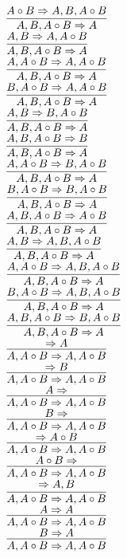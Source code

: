 \documentclass[11pt]{article}
\begin{document}
\begin{center}
\bigskip
\\$\infer{A, B, A\circ B\Rightarrow A}{A\circ B\Rightarrow A, B, A\circ B}$
\bigskip
\\$\infer{A, B, A\circ B\Rightarrow A}{A, B\Rightarrow A, A\circ B}$
\bigskip
\\$\infer{A, B, A\circ B\Rightarrow A}{A, A\circ B\Rightarrow A, A\circ B}$
\bigskip
\\$\infer{A, B, A\circ B\Rightarrow A}{B, A\circ B\Rightarrow A, A\circ B}$
\bigskip
\\$\infer{A, B, A\circ B\Rightarrow A}{A, B\Rightarrow B, A\circ B}$
\bigskip
\\$\infer{A, B, A\circ B\Rightarrow A}{A, B, A\circ B\Rightarrow B}$
\bigskip
\\$\infer{A, B, A\circ B\Rightarrow A}{A, A\circ B\Rightarrow B, A\circ B}$
\bigskip
\\$\infer{A, B, A\circ B\Rightarrow A}{B, A\circ B\Rightarrow B, A\circ B}$
\bigskip
\\$\infer{A, B, A\circ B\Rightarrow A}{A, B, A\circ B\Rightarrow A\circ B}$
\bigskip
\\$\infer{A, B, A\circ B\Rightarrow A}{A, B\Rightarrow A, B, A\circ B}$
\bigskip
\\$\infer{A, B, A\circ B\Rightarrow A}{A, A\circ B\Rightarrow A, B, A\circ B}$
\bigskip
\\$\infer{A, B, A\circ B\Rightarrow A}{B, A\circ B\Rightarrow A, B, A\circ B}$
\bigskip
\\$\infer{A, B, A\circ B\Rightarrow A}{A, B, A\circ B\Rightarrow B, A\circ B}$
\bigskip
\\$\infer{A, A\circ B\Rightarrow A, A\circ B}{\Rightarrow A}$
\bigskip
\\$\infer{A, A\circ B\Rightarrow A, A\circ B}{\Rightarrow B}$
\bigskip
\\$\infer{A, A\circ B\Rightarrow A, A\circ B}{A\Rightarrow }$
\bigskip
\\$\infer{A, A\circ B\Rightarrow A, A\circ B}{B\Rightarrow }$
\bigskip
\\$\infer{A, A\circ B\Rightarrow A, A\circ B}{\Rightarrow A\circ B}$
\bigskip
\\$\infer{A, A\circ B\Rightarrow A, A\circ B}{A\circ B\Rightarrow }$
\bigskip
\\$\infer{A, A\circ B\Rightarrow A, A\circ B}{\Rightarrow A, B}$
\bigskip
\\$\infer{A, A\circ B\Rightarrow A, A\circ B}{A\Rightarrow A}$
\bigskip
\\$\infer{A, A\circ B\Rightarrow A, A\circ B}{B\Rightarrow A}$

\end{center}
\end{document}
